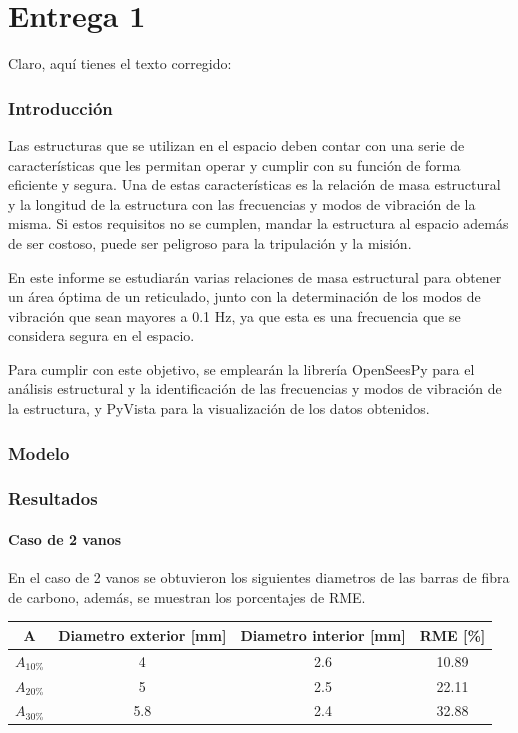 \part{Entrega 1}
Claro, aquí tienes el texto corregido:

\section{Introducción}
Las estructuras que se utilizan en el espacio deben contar con una serie de características que les permitan operar y cumplir con su función de forma eficiente y segura. Una de estas características es la relación de masa estructural y la longitud de la estructura con las frecuencias y modos de vibración de la misma. Si estos requisitos no se cumplen, mandar la estructura al espacio además de ser costoso, puede ser peligroso para la tripulación y la misión.

En este informe se estudiarán varias relaciones de masa estructural para obtener un área óptima de un reticulado, junto con la determinación de los modos de vibración que sean mayores a 0.1 Hz, ya que esta es una frecuencia que se considera segura en el espacio.

Para cumplir con este objetivo, se emplearán la librería OpenSeesPy para el análisis estructural y la identificación de las frecuencias y modos de vibración de la estructura, y PyVista para la visualización de los datos obtenidos.
\newpage
\section{Modelo}


\section{Resultados}

\subsection{Caso de 2 vanos}
En el caso de 2 vanos se obtuvieron los siguientes diametros de las barras de fibra de carbono, además, se muestran los porcentajes de RME.

\begin{table}[H]
    \centering
    \begin{tabular}{cccc}
    \toprule
     A & Diametro exterior [mm] & Diametro interior [mm] & RME [\%] \\
    \midrule
     $A_{10\%}$ &  4 &  2.6 &  10.89 \\
     $A_{20\%}$ &  5 &  2.5 &  22.11 \\
     $A_{30\%}$ &  5.8 &  2.4 &  32.88 \\
    \bottomrule
    \end{tabular}
\end{table}

